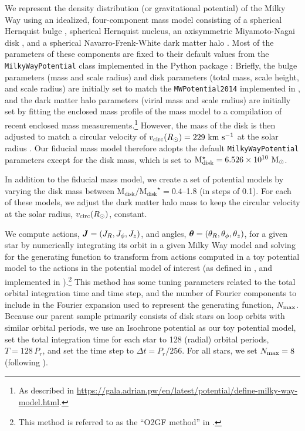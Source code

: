 \documentclass[modern]{aastex63}
\newcommand{\mdisk}{\ensuremath{\mathrm{M}_\mathrm{disk}}}
\newcommand{\mratio}{\ensuremath{\mdisk / \mdisk^\star}}
\begin{document}
We represent the density distribution (or gravitational potential) of the
Milky Way using an idealized, four-component mass model consisting of a
spherical Hernquist bulge \citep{Hernquist:1990}, spherical Hernquist nucleus,
an axisymmetric Miyamoto-Nagai disk \citep{Miyamoto:1975}, and a spherical
Navarro-Frenk-White dark matter halo \citep{Navarro:1996}.
Most of the parameters of these components are fixed to their default values
from the \texttt{MilkyWayPotential} class implemented in the 
Python package \citep[v1.1;][]{gala}:
Briefly, the bulge parameters (mass and scale radius) and disk parameters (total
mass, scale height, and scale radius) are initially set to match the
\texttt{MWPotential2014} implemented in  \citep{Bovy:2015}, and
the dark matter halo parameters (virial mass and scale radius) are initially set
by fitting the enclosed mass profile of the mass model to a compilation of
recent enclosed mass measurements.\footnote{As described in
\url{https://gala.adrian.pw/en/latest/potential/define-milky-way-model.html}.}
However, the mass of the disk is then adjusted to match a circular velocity of
$v_{\rm circ}(R_\odot) = 229~\mathrm{km}~\mathrm{s}^{-1}$ at the solar radius \citep{Eilers:2019}.
Our fiducial mass model therefore adopts the default \texttt{MilkyWayPotential}
parameters except for the disk mass, which is set to $\mdisk^\star = 6.526
\times 10^{10}~\Msun$.

In addition to the fiducial mass model, we create a set of potential models by
varying the disk mass between $\mratio = 0.4$--1.8 (in steps of 0.1).
For each of these models, we adjust the dark matter halo mass to keep the
circular velocity at the solar radius, $v_{\rm circ}(R_\odot)$, constant.

We compute actions, $\boldsymbol{J} = (J_R, J_\phi, J_z)$, and angles, $\boldsymbol{\theta} =
(\theta_R, \theta_\phi, \theta_z)$, for a given star by numerically integrating
its orbit in a given Milky Way model and solving for the generating function to
transform from actions computed in a toy potential model to the actions in the
potential model of interest (as defined in \citealt{Sanders:2014}, and
implemented in ).\footnote{This method is referred to as the
``O2GF method'' in \citet{Sanders:2016}.}
This method has some tuning parameters related to the total orbital integration
time and time step, and the number of Fourier components to include in the
Fourier expansion used to represent the generating function, $N_{\rm max}$.
Because our parent sample primarily consists of disk stars on loop orbits with
similar orbital periods, we use an Isochrone potential as our toy potential
model, set the total integration time for each star to 128 (radial) orbital
periods, $T=128\,P_r$, and set the time step to $\Delta t = P_r / 256$.
For all stars, we set $N_{\rm max} = 8$ (following \citealt{Sanders:2016}).
\end{document}
